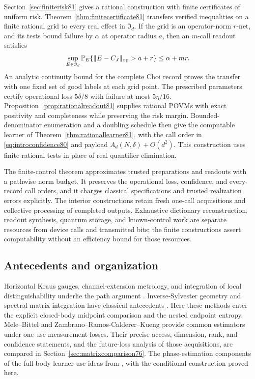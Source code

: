 Section~\ref{sec:finiterisk81} gives a rational construction with
finite certificates of uniform risk.  Theorem~\ref{thm:finitecertificate81}
transfers verified inequalities on a finite rational grid to every
real effect in $\mathfrak I_d$.  If the grid is an operator-norm
$r$-net, and its tests bound failure by $\alpha$ at operator
radius $a$, then an $m$-call readout satisfies
\[
 \sup_{E\in\mathfrak I_d}
   \mathbb P_E\{\|E-C_J\|_{\rm op}>a+r\}\le\alpha+mr.
\]
An analytic continuity bound for the complete Choi record proves
the transfer with one fixed set of good labels at each grid point.
The prescribed parameters certify operational loss $5\delta/8$
with failure at most $5\eta/16$.
Proposition~\ref{prop:rationalreadout81} supplies rational POVMs
with exact positivity and completeness while preserving the risk
margin.  Bounded-denominator enumeration and a doubling schedule
then give the computable learner of
Theorem~\ref{thm:rationallearner81}, with the call order in
\eqref{eq:introconfidence80} and payload
$A_d(N,\delta)+O(d^2)$.  This construction uses finite rational
tests in place of real quantifier elimination.

The finite-control theorem approximates trusted preparations and
readouts with a pathwise norm budget.  It preserves the operational
loss, confidence, and every-record call orders, and it charges
classical specifications and trusted realization errors explicitly.
The interior constructions retain fresh one-call acquisitions and
collective processing of completed outputs.  Exhaustive dictionary
reconstruction, readout synthesis, quantum storage, and known-control
work are separate resources from device calls and transmitted bits;
the finite constructions assert computability without an efficiency
bound for those resources.

\subsection{Antecedents and organization}
Horizontal Kraus gauges, channel-extension metrology, and integration
of local distinguishability underlie the path argument
\cite{FI76,DKG67,DM76,KGAD76,YF76,SD76}.  Inverse-Sylvester
geometry and spectral matrix integration have classical antecedents
\cite{Dittmann76,SZGeom76}.  Here these methods enter the explicit
closed-body midpoint comparison and the nested endpoint entropy.
Mele--Bittel \cite{MB67} and
Zambrano--Ramos-Calderer--Kueng \cite{ZRK76} provide common
estimators under one-use measurement losses.  Their precise access,
dimension, rank, and confidence statements, and the future-loss
analysis of those acquisitions, are compared in
Section~\ref{sec:matrixcomparison76}.  The phase-estimation
components of the full-body learner use ideas from
\cite{HB76,KLY76}, with the conditional construction proved here.

